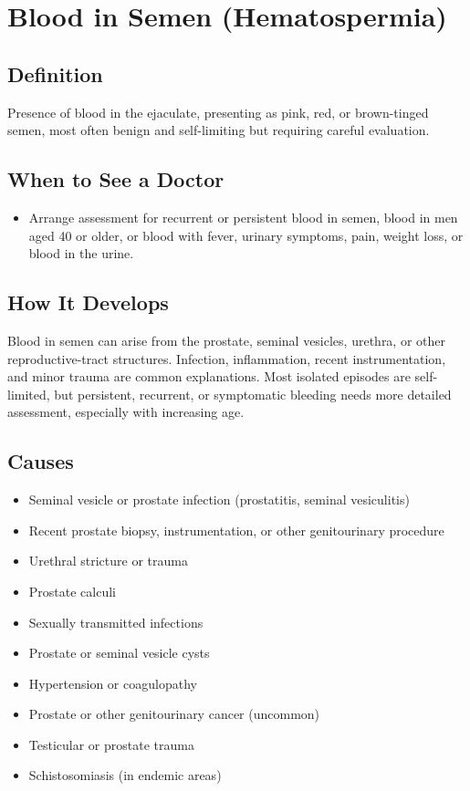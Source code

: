 \chapter{Blood in Semen (Hematospermia)}

\section*{Definition}
Presence of blood in the ejaculate, presenting as pink, red, or brown-tinged semen, most often benign and self-limiting but requiring careful evaluation.

\section*{When to See a Doctor}

\begin{itemize}
 \item Arrange assessment for recurrent or persistent blood in semen, blood in men aged 40 or older, or blood with fever, urinary symptoms, pain, weight loss, or blood in the urine.
\end{itemize}

\section*{How It Develops}
Blood in semen can arise from the prostate, seminal vesicles, urethra, or other reproductive-tract structures. Infection, inflammation, recent instrumentation, and minor trauma are common explanations. Most isolated episodes are self-limited, but persistent, recurrent, or symptomatic bleeding needs more detailed assessment, especially with increasing age.

\section*{Causes}
\begin{itemize}
 \item Seminal vesicle or prostate infection (prostatitis, seminal vesiculitis)
 \item Recent prostate biopsy, instrumentation, or other genitourinary procedure
 \item Urethral stricture or trauma
 \item Prostate calculi
 \item Sexually transmitted infections
 \item Prostate or seminal vesicle cysts
 \item Hypertension or coagulopathy
 \item Prostate or other genitourinary cancer (uncommon)
 \item Testicular or prostate trauma
 \item Schistosomiasis (in endemic areas)
\end{itemize}

